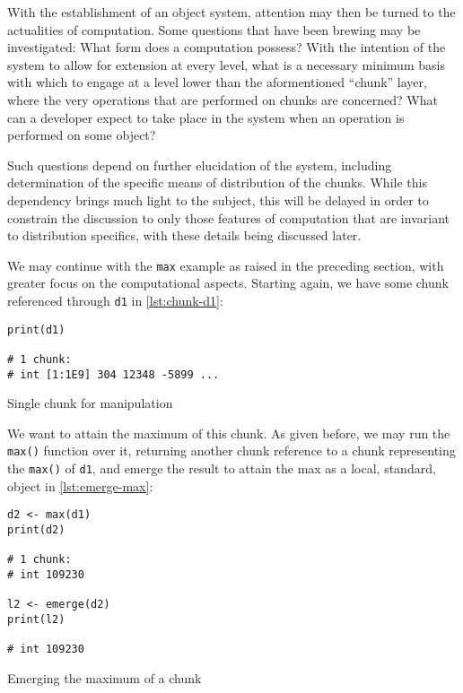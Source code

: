 With the establishment of an object system, attention may then be turned
to the actualities of computation. Some questions that have been brewing
may be investigated: What form does a computation possess? With the
intention of the system to allow for extension at every level, what is a
necessary minimum basis with which to engage at a level lower than the
aformentioned ``chunk'' layer, where the very operations that are
performed on chunks are concerned? What can a developer expect to take
place in the system when an operation is performed on some object?

Such questions depend on further elucidation of the system, including
determination of the specific means of distribution of the chunks. While
this dependency brings much light to the subject, this will be delayed
in order to constrain the discussion to only those features of
computation that are invariant to distribution specifics, with these
details being discussed later.

We may continue with the \texttt{max} example as raised in the preceding
section, with greater focus on the computational aspects. Starting
again, we have some chunk referenced through \texttt{d1} in \ref{lst:chunk-d1}:

\begin{listing}
    \begin{verbatim}
print(d1)

# 1 chunk:
# int [1:1E9] 304 12348 -5899 ...
    \end{verbatim}
    \caption{Single chunk for manipulation}
    \label{lst:chunk-d1}
\end{listing}

We want to attain the maximum of this chunk. As given before, we may run
the \texttt{max()} function over it, returning another chunk reference to
a chunk representing the \texttt{max()} of \texttt{d1}, and emerge the
result to attain the max as a local, standard, object in \ref{lst:emerge-max}:

\begin{listing}
    \begin{verbatim}
d2 <- max(d1)
print(d2)

# 1 chunk:
# int 109230

l2 <- emerge(d2)
print(l2)

# int 109230
    \end{verbatim}
    \caption{Emerging the maximum of a chunk}
    \label{lst:emerge-max}
\end{listing}

